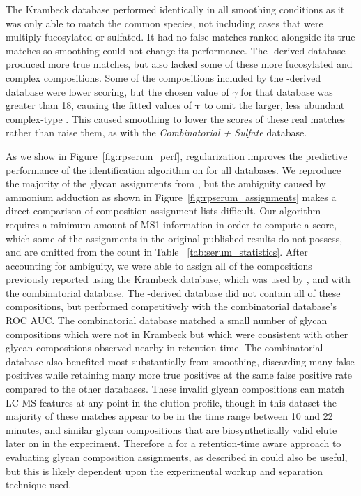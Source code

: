     The Krambeck database performed identically in all smoothing conditions as it
    was only able to match the common species, not including cases that were multiply
    fucosylated or sulfated. It had no false matches ranked alongside its true matches so
    smoothing could not change its performance. The \glyspace-derived database produced more true
    matches, but also lacked some of these more fucosylated and complex compositions. Some of the
    compositions included by the \glyspace-derived database were lower scoring, but the chosen
    value of $\gamma$ for that database was greater than 18, causing the fitted values of $\mathbf{\tau}$
    to omit the larger, less abundant complex-type \nglycans. This caused smoothing to lower the scores
    of these real matches rather than raise them, as with the \textit{Combinatorial + Sulfate} database.

    As we show in Figure~\ref{fig:rpserum_perf}, regularization improves the
    predictive performance of the identification algorithm on \rpserum for all databases.
    We reproduce the majority of the glycan assignments from \cite{Yu2013}, but the ambiguity
    caused by ammonium adduction as shown in Figure~\ref{fig:rpserum_assignments} makes a
    direct comparison of composition assignment lists difficult. Our algorithm requires a minimum
    amount of MS1 information in order to compute a score, which some of the assignments in the
    original published results do not possess, and are omitted from the count in Table~
    \ref{tab:serum_statistics}. After accounting for ambiguity, we were able to assign all
    of the compositions previously reported using the Krambeck database, which was used
    by \cite{Yu2013}, and with the combinatorial database. The \glyspace-derived database did not
    contain all of these compositions, but performed competitively with the combinatorial
    database's ROC AUC. The combinatorial database matched a small number of glycan compositions
    which were not in Krambeck but which were consistent with other glycan compositions
    observed nearby in retention time. The combinatorial database also benefited most
    substantially from smoothing, discarding many false positives while retaining many more
    true positives at the same false positive rate compared to the other databases. These
    invalid glycan compositions can match LC-MS features at any point in the elution profile,
    though in this dataset the majority of these matches appear to be in the time range between
    10 and 22 minutes, and similar glycan compositions that are biosynthetically valid elute
    later on in the experiment. Therefore a for a retention-time aware approach to evaluating glycan
    composition assignments, as described in \cite{Hu2016} could also be useful, but this is
    likely dependent upon the experimental workup and separation technique used.

